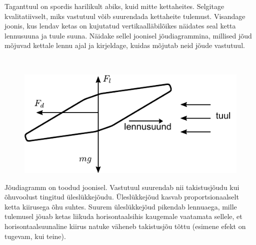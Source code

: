 
Taganttuul on spordis harilikult abiks, kuid mitte kettaheites. Selgitage kvalitatiivselt, miks vastutuul võib suurendada kettaheite tulemust. Visandage joonis, kus lendav ketas on kujutatud vertikaalläbilõikes näidates seal ketta lennusuuna ja tuule suuna. Näidake sellel joonisel jõudiagrammina, millised jõud mõjuvad kettale lennu ajal ja kirjeldage, kuidas mõjutab neid jõude vastutuul.


\hint

\solu
\

\begin{figure}[h]
    \centering
    \includegraphics[]{2022-v3g-01-sol.pdf}
\end{figure}

Jõudiagramm on toodud joonisel. Vastutuul suurendab nii takistusjõudu kui õhuvoolust tingitud üleslükkejõudu. Üleslükkejõud kasvab proportsionaalselt ketta kiirusega õhu suhtes. Suurem üleslükkejõud pikendab lennuaega, mille tulemusel jõuab ketas liikuda horisontaalsihis kaugemale vaatamata sellele, et horisontaalsuunaline kiirus natuke väheneb takistusjõu tõttu (esimene efekt on tugevam, kui teine).
\probend